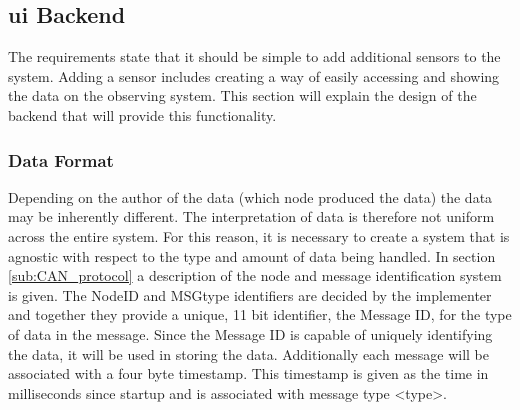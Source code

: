 \subsection{\acs{ui} Backend}
The requirements state that it should be simple to add additional sensors to the system.
Adding a sensor includes creating a way of easily accessing and showing the data on the observing system.
This section will explain the design of the backend that will provide this functionality.

\subsubsection*{Data Format}
Depending on the author of the data (which node produced the data) the data may be inherently different.
The interpretation of data is therefore not uniform across the entire system.
For this reason, it is necessary to create a system that is agnostic with respect to the type and amount of data being handled.
In section \ref{sub:CAN_protocol} a description of the node and message identification system is given.
The NodeID and MSGtype identifiers are decided by the implementer and together they provide a unique, 11 bit identifier, the Message ID, for the type of data in the message.
Since the Message ID is capable of uniquely identifying the data, it will be used in storing the data.
Additionally each message will be associated with a four byte timestamp.
This timestamp is given as the time in milliseconds since startup and is associated with message type <type>. 


